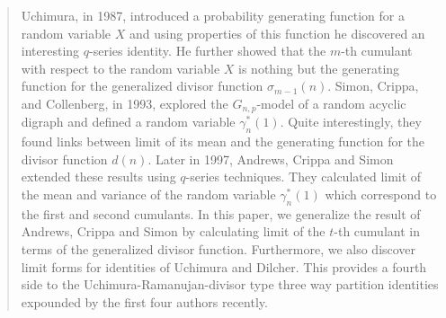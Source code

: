 \documentclass[11pt,reqno]{amsart}
\renewcommand{\(}{\left\(}
\renewcommand{\)}{\right\)}
\renewcommand{\[}{\left\[}
\renewcommand{\]}{\right\]}
\numberwithin{equation}{section}
\theoremstyle{plain}
\begin{document}
\begin{abstract}

Uchimura, in 1987,  introduced a probability generating function for a random variable $X$ and using properties of this function he discovered an interesting $q$-series identity. 
 He further showed that the $m$-th cumulant  with respect to the random variable $X$ is nothing but  the  generating function for the generalized divisor function $\sigma_{m-1}(n)$.
 Simon, Crippa, and Collenberg, in 1993, explored the $G_{n,p}$-model of a random acyclic digraph and defined a random variable $\gamma_n^{*}(1)$.  Quite interestingly,  they  found links between limit of its mean and the generating function for the divisor function $d(n)$.    Later in 1997,  Andrews, Crippa and Simon extended these results using $q$-series techniques. They calculated limit of the mean and variance of the random variable $\gamma_n^{*}(1)$  which correspond to the first and second cumulants. 
 In this paper,  we generalize the result of Andrews,  Crippa and Simon by calculating limit of the $t$-th cumulant in terms of the generalized divisor function.  Furthermore,  we also discover limit forms for identities of Uchimura and Dilcher.  This provides a fourth side to the Uchimura-Ramanujan-divisor type three way partition identities expounded by the first four authors recently.  
 
 
 
\end{abstract}
\end{document}
